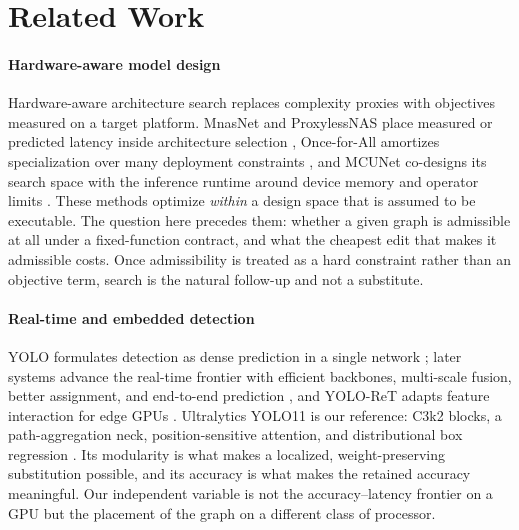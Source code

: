 \section{Related Work}
\label{sec:related}

\paragraph*{Hardware-aware model design}
Hardware-aware architecture search replaces complexity proxies with objectives
measured on a target platform. MnasNet and ProxylessNAS place measured or
predicted latency inside architecture selection
\cite{tan2019mnasnet,cai2019proxyless}, Once-for-All amortizes specialization
over many deployment constraints \cite{cai2020ofa}, and MCUNet co-designs its
search space with the inference runtime around device memory and operator limits
\cite{lin2020mcunet}. These methods optimize \emph{within} a design space that
is assumed to be executable. The question here precedes them: whether a given
graph is admissible at all under a fixed-function contract, and what the cheapest
edit that makes it admissible costs. Once admissibility is treated as a hard
constraint rather than an objective term, search is the natural follow-up and not
a substitute.

\paragraph*{Real-time and embedded detection}
YOLO formulates detection as dense prediction in a single network
\cite{redmon2016yolo}; later systems advance the real-time frontier with
efficient backbones, multi-scale fusion, better assignment, and end-to-end
prediction \cite{wang2023yolov7,wang2024yolov10}, and YOLO-ReT adapts feature
interaction for edge GPUs \cite{ganesh2022yoloret}. Ultralytics YOLO11
\cite{jocher2024yolo11} is our reference: C3k2 blocks, a path-aggregation neck,
position-sensitive attention, and distributional box regression
\cite{li2020gfl}. Its modularity is what makes a localized, weight-preserving
substitution possible, and its accuracy is what makes the retained accuracy
meaningful. Our independent variable is not the accuracy--latency frontier on a
GPU but the placement of the graph on a different class of processor.

